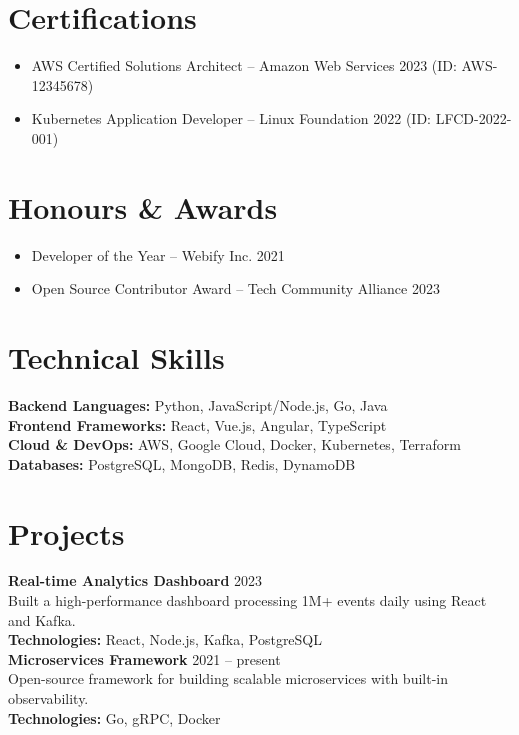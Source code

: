 \documentclass[10pt]{article}
\begin{document}
\section*{Certifications}
\begin{itemize}[nosep,leftmargin=*]
    \item AWS Certified Solutions Architect -- Amazon Web Services \hfill 2023
         (ID: AWS-12345678)
    \item Kubernetes Application Developer -- Linux Foundation \hfill 2022
         (ID: LFCD-2022-001)
\end{itemize}

\section*{Honours \& Awards}
\begin{itemize}[nosep,leftmargin=*]
    \item Developer of the Year -- Webify Inc. \hfill 2021
    \item Open Source Contributor Award -- Tech Community Alliance \hfill 2023
\end{itemize}

\section*{Technical Skills}
\textbf{Backend Languages:} Python, JavaScript/Node.js, Go, Java \\
\textbf{Frontend Frameworks:} React, Vue.js, Angular, TypeScript \\
\textbf{Cloud \& DevOps:} AWS, Google Cloud, Docker, Kubernetes, Terraform \\
\textbf{Databases:} PostgreSQL, MongoDB, Redis, DynamoDB \\

\section*{Projects}
\textbf{Real-time Analytics Dashboard} \hfill 2023 \\
Built a high-performance dashboard processing 1M+ events daily using React and Kafka. \\
\textcolor{secondary}{\textbf{Technologies:}} React, Node.js, Kafka, PostgreSQL \\

\textbf{Microservices Framework} \hfill 2021 -- present \\
Open-source framework for building scalable microservices with built-in observability. \\
\textcolor{secondary}{\textbf{Technologies:}} Go, gRPC, Docker \\
\end{document}
